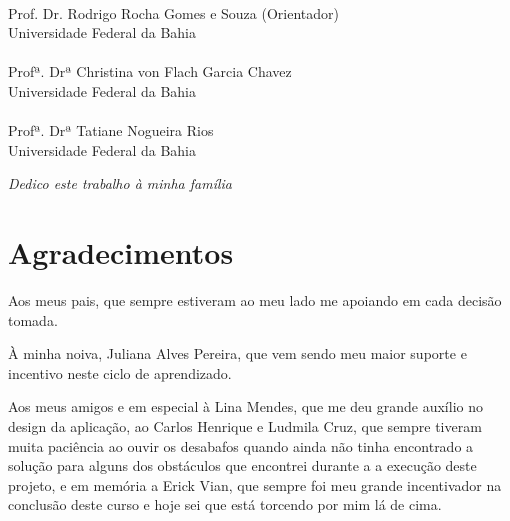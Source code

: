 \documentclass[12pt, a4paper]{report}
\begin{document}
\begin{flushright}
\begin{minipage}[l]{12cm}
\begin{center}
\uline{\hspace{10.5cm}} \\
Prof. Dr. Rodrigo Rocha Gomes e Souza (Orientador) \\ Universidade Federal da Bahia \\
\vspace{1cm}
\uline{\hspace{10.5cm}} \\
Profª. Drª Christina von Flach Garcia Chavez\\ Universidade Federal da Bahia \\
\vspace{1cm}
\uline{\hspace{10.5cm}} \\
Profª. Drª Tatiane Nogueira Rios\\ Universidade Federal da Bahia \\


\end{center}
\end{minipage}
\end{flushright}
\thispagestyle{empty} 

\newpage
\vspace*{21.9cm}
\begin{flushright}
\textit{Dedico este trabalho à minha família}
\end{flushright}
\thispagestyle{empty} 


\newpage
\chapter*{Agradecimentos}
\thispagestyle{empty}
Aos meus pais, que sempre estiveram ao meu lado me apoiando em cada decisão tomada.

À minha noiva, Juliana Alves Pereira, que vem sendo meu maior suporte e incentivo neste ciclo de aprendizado. 

Aos meus amigos e em especial à Lina Mendes, que me deu grande auxílio no design da aplicação, ao Carlos Henrique e Ludmila Cruz, que sempre tiveram muita paciência ao ouvir os desabafos quando ainda não tinha encontrado a solução para alguns dos obstáculos que encontrei durante a a execução deste projeto, e em memória a Erick Vian, que sempre foi meu grande incentivador na conclusão deste curso e hoje sei que está torcendo por mim lá de cima.
\end{document}
